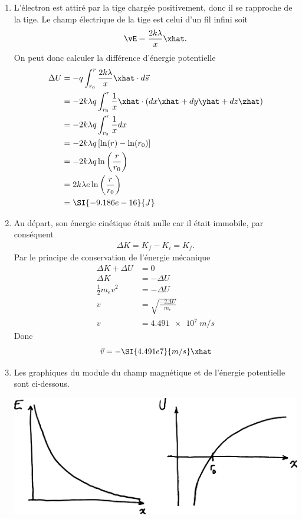 \begin{enumerate}
    \item L'électron est attiré par la tige chargée positivement, donc il se
        rapproche de la tige. Le champ électrique de la tige est celui d'un fil
        infini soit
        \[\vE = \frac{2k\lambda}{x} \xhat.\]
        On peut donc calculer la différence d'énergie potentielle
        \begin{align*}
            \Delta U &= -q \int_{r_0}^{r} \frac{2k\lambda}{x} \xhat \cdot d\vec{s} \\
                     &= -2k\lambda q \int_{r_0}^r \frac{1}{x} \xhat \cdot (dx \xhat
                        + dy \yhat + dz \zhat) \\
                     &= -2k\lambda q \int_{r_0}^r \frac{1}{x} dx \\
                     &= -2k\lambda q \left[ \ln(r) - \ln(r_0) \right] \\
                     &= -2k\lambda q \ln\left( \frac{r}{r_0} \right) \\
                     &= 2k\lambda e  \ln\left( \frac{r}{r_0} \right) \\
                     &= \SI{-9.186e-16}{J}
        \end{align*}
    \item Au départ, son énergie cinétique était nulle car il était immobile,
        par conséquent
        \begin{align*}
            \Delta K = K_f - K_i = K_f.
        \end{align*}
        Par le principe de conservation de l'énergie mécanique
        \begin{align*}
            \Delta K + \Delta U &= 0 \\
            \Delta K &= -\Delta U \\
            \frac{1}{2} m_e v^2 &= -\Delta U \\
            v &= \sqrt{\frac{-2\Delta U}{m_e}} \\
            v &= \SI{4.491e7}{m/s}
        \end{align*}
        Donc
        \[\vec{v} = -\SI{4.491e7}{m/s} \xhat\]
    \item Les graphiques du module du champ magnétique et de l'énergie
        potentielle sont ci-dessous.

      \begin{center}
        \includegraphics[scale=0.09]{04-potentiel/figures/exercice-tige-energie-potentielle-graphiques.pdf}
      \end{center}
\end{enumerate}



